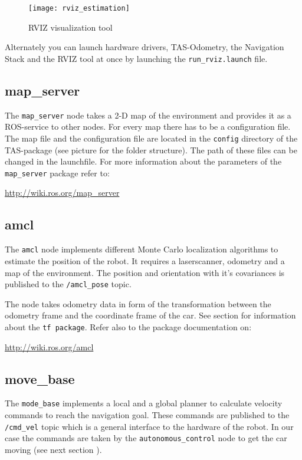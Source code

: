 \begin{figure}[h]
	\centering
		\texttt{[image: rviz\_estimation]}
	\caption{RVIZ visualization tool}
	\label{fig:rviz_estimation}
\end{figure}


Alternately you can launch hardware drivers, TAS-Odometry, the Navigation Stack and the RVIZ tool at once by launching the \texttt{run\_rviz.launch} file.

\subsection{map\_server}
\label{sec:tas_package_map_server}
The \texttt{map\_server} node takes a 2-D map of the environment and provides it as a ROS-service to other nodes. For every map there has to be a configuration file. The map file and the configuration file are located in the \texttt{config} directory of the TAS-package (see picture  for the folder structure). The path of these files can be changed in the launchfile. For more information about the parameters of the \texttt{map\_server} package refer to:

\hyperref[http://wiki.ros.org/map_server]{http://wiki.ros.org/map\_server}


\subsection{amcl}
\label{sec:tas_package_amcl}
The \texttt{amcl} node implements different Monte Carlo localization algorithms to estimate the position of the robot. It requires a laserscanner, odometry and a map of the environment. The position and orientation with it's covariances is published to the \texttt{/amcl\_pose} topic.

The node takes odometry data in form of the transformation between the odometry frame and the coordinate frame of the car. See section  for information about the \texttt{tf package}. Refer also to the package documentation on:

\hyperref[http://wiki.ros.org/amcl]{http://wiki.ros.org/amcl}



\subsection{move\_base}
\label{sec:tas_package_move_base}

The \texttt{mode\_base} implements a local and a global planner to calculate velocity commands to reach the navigation goal. These commands are published to the \texttt{/cmd\_vel} topic which is a general interface to the hardware of the robot. In our case the commands are taken by the \texttt{autonomous\_control} node to get the car moving (see next section ).

